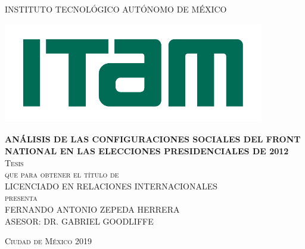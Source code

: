 \begin{titlepage}

\begin{center}

\textsc{\large{INSTITUTO TECNOLÓGICO AUTÓNOMO DE MÉXICO}}\\[2.2em]

\begin{center}
	\includegraphics[width=11.4cm, height = 4.4cm]{Figs/logo-ITAM.pdf}
\end{center}

\textsc{\large \textbf{ANÁLISIS DE LAS CONFIGURACIONES SOCIALES DEL FRONT NATIONAL EN LAS ELECCIONES PRESIDENCIALES DE 2012}}\\[2.2em]

\textsc{\large Tesis}\\[2em]

\textsc{que para obtener el título de}\\[1em]

\textsc{LICENCIADO EN RELACIONES INTERNACIONALES}\\[1em]

\textsc{presenta}\\[2.2em]

\textsc{\Large FERNANDO ANTONIO ZEPEDA HERRERA}\\[2.2em]

\textsc{\large ASESOR: DR. GABRIEL GOODLIFFE}

\end{center}

\vspace*{\fill}
\textsc{Ciudad de México \hspace*{\fill} 2019}

\end{titlepage}